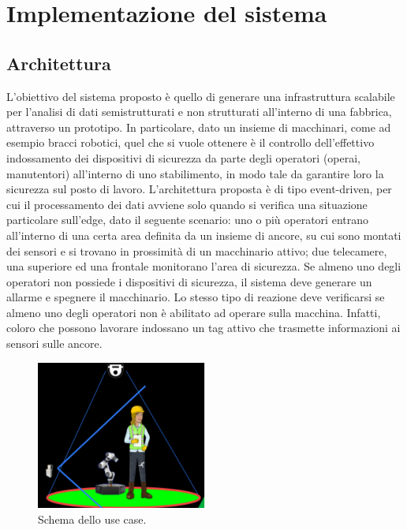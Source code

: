 \chapter{Implementazione del sistema}

\section{Architettura}
L’obiettivo del sistema proposto è quello di generare una infrastruttura scalabile per l’analisi di dati semistrutturati e non strutturati all’interno di una fabbrica, attraverso un prototipo. In particolare, dato un insieme di macchinari, come ad esempio bracci robotici, quel che si vuole ottenere è il controllo dell’effettivo indossamento dei dispositivi di sicurezza da parte degli operatori (operai, manutentori) all'interno di uno stabilimento, in modo tale da garantire loro la sicurezza sul posto di lavoro. %
L’architettura proposta è di tipo event-driven, per cui il processamento dei dati avviene solo quando si verifica una situazione particolare sull’edge, dato il seguente scenario: uno o più operatori entrano all’interno di una certa area definita da un insieme di ancore, su cui sono montati dei sensori e si trovano in prossimità di un macchinario attivo; due telecamere, una superiore ed una frontale monitorano l’area di sicurezza. Se almeno uno degli operatori non possiede i dispositivi di sicurezza, il sistema deve generare un allarme e spegnere il macchinario. Lo stesso tipo di reazione deve verificarsi se almeno uno degli operatori non è abilitato ad operare sulla macchina. Infatti, coloro che possono lavorare indossano un tag attivo che trasmette informazioni ai sensori sulle ancore.

\begin{figure}[htbp]
    \centering
    \includegraphics[width=0.5\textwidth]{figures/use-case.png}
    \caption{Schema dello use case.} 
    \label{use-case}
\end{figure}


